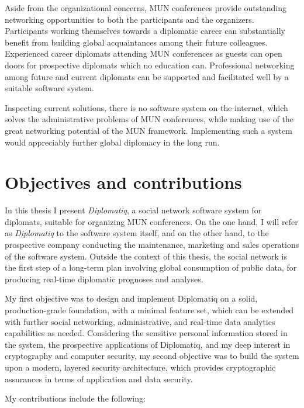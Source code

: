 Aside from the organizational concerns, MUN conferences provide outstanding networking opportunities to both the participants and the organizers. Participants working themselves towards a diplomatic career can substantially benefit from building global acquaintances among their future colleagues. Experienced career diplomats attending MUN conferences as guests can open doors for prospective diplomats which no education can. Professional networking among future and current diplomats can be supported and facilitated well by a suitable software system.

Inspecting current solutions, there is no software system on the internet, which solves the administrative problems of MUN conferences, while making use of the great networking potential of the MUN framework. Implementing such a system would appreciably further global diplomacy in the long run.

\section{Objectives and contributions}

In this thesis I present \emph{Diplomatiq}, a social network software system for diplomats, suitable for organizing MUN conferences. On the one hand, I will refer as \emph{Diplomatiq} to the software system itself, and on the other hand, to the prospective company conducting the maintenance, marketing and sales operations of the software system. Outside the context of this thesis, the social network is the first step of a long-term plan involving global consumption of public data, for producing real-time diplomatic prognoses and analyses.

My first objective was to design and implement Diplomatiq on a solid, production-grade foundation, with a minimal feature set, which can be extended with further social networking, administrative, and real-time data analytics capabilities as needed. Considering the sensitive personal information stored in the system, the prospective applications of Diplomatiq, and my deep interest in cryptography and computer security, my second objective was to build the system upon a modern, layered security architecture, which provides cryptographic assurances in terms of application and data security.

My contributions include the following:

